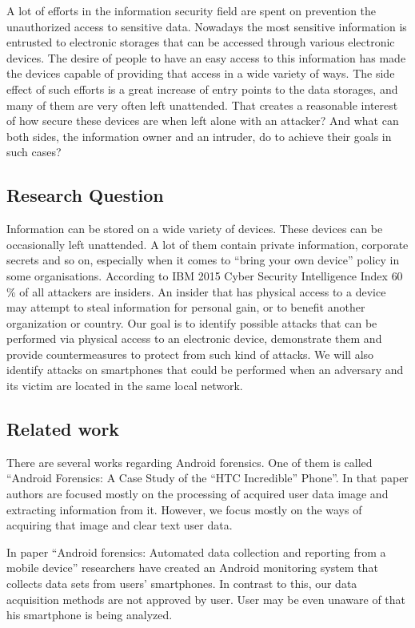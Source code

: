A lot of efforts in the information security field are spent on prevention the unauthorized access to sensitive data. Nowadays the most sensitive information is entrusted to electronic storages that can be accessed through various electronic devices. The desire of people to have an easy access to this information has made the devices capable of providing that access in a wide variety of ways. The side effect of such efforts is a great increase of entry points to the data storages, and many of them are very often left unattended. That creates a reasonable interest of how secure these devices are when left alone with an attacker? And what can both sides, the information owner and an intruder, do to achieve their goals in such cases?


\subsection{Research Question}

Information can be stored on a wide variety of devices. These devices can be occasionally  left unattended. A lot of them contain private information, corporate secrets and so on, especially when it comes to “bring your own device” policy in some organisations. According to  IBM 2015 Cyber Security Intelligence Index \cite{rsi-index} 60 \% of all attackers are insiders. An insider that has physical access to a device may attempt to steal information for personal gain, or to benefit another organization or country. Our goal is to identify possible attacks that can be performed via physical access to an electronic device, demonstrate them and provide countermeasures to protect from such kind of attacks. We will also identify attacks on smartphones that could be performed when an adversary and its victim are located in the same local network.


\subsection{Related work}

There are several works regarding Android forensics. One of them is called “Android Forensics: A Case Study of the “HTC Incredible” Phone”. In that paper authors are focused mostly on the processing of acquired user data image and extracting information from it. However, we focus mostly on the ways of acquiring that image and clear text user data.

In paper “Android forensics: Automated data collection and reporting from a mobile device” researchers have created an Android monitoring system that collects data sets from users’ smartphones. In contrast to this, our data acquisition methods are not approved by user. User may be even unaware of that his smartphone is being analyzed.

